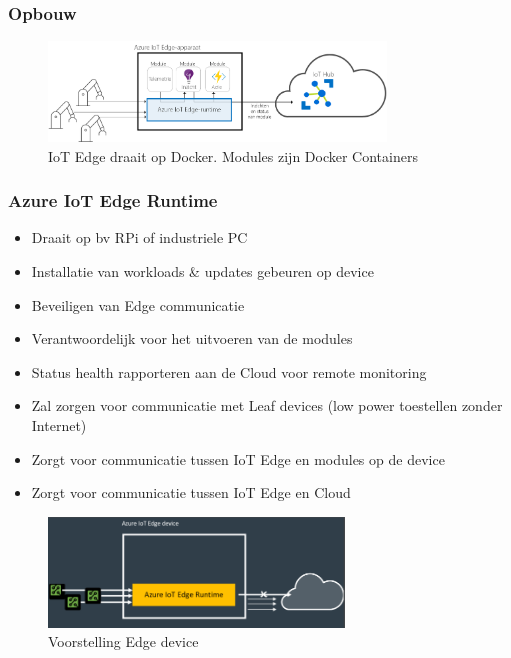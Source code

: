\documentclass{article}
\begin{document}
\subsubsection{Opbouw}

\begin{figure}[H]
    \centering
    \includegraphics[width=0.8\textwidth]{iot-edge2.png}
    \caption{IoT Edge draait op Docker. Modules zijn Docker Containers}
\end{figure}

\subsubsection{Azure IoT Edge Runtime}

\begin{itemize}
    \item Draait op bv RPi of industriele PC
    \item Installatie van workloads \& updates gebeuren op device
    \item Beveiligen van Edge communicatie
    \item Verantwoordelijk voor het uitvoeren van de modules
    \item Status health rapporteren aan de Cloud voor remote monitoring
    \item Zal zorgen voor communicatie met Leaf devices (low power toestellen zonder Internet)
    \item Zorgt voor communicatie tussen IoT Edge en modules op de device
    \item Zorgt voor communicatie tussen IoT Edge en Cloud
\end{itemize}

\begin{figure}[H]
    \centering
    \includegraphics[width=0.7\textwidth]{iot-edge3.png}
    \caption{Voorstelling Edge device}
\end{figure}
\end{document}
